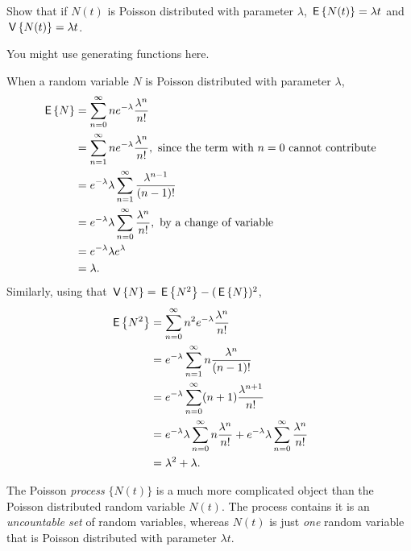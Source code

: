 \begin{question}
  Show that if $N(t)$ is Poisson distributed with parameter $\lambda$, $\,\mathsf{E}\left\{N(t)\right\} = \lambda t$ and $\,\mathsf{V}\left\{N(t)\right\} = \lambda t$. 


  \begin{hint}
  You might use generating functions here.
  \end{hint}

  \begin{solution} 
    When a random variable $N$ is Poisson distributed with parameter
    $\lambda$,
    \begin{equation*}
      \begin{split}
      \,\mathsf{E}\left\{N\right\} 
&= \sum_{n=0}^\infty n e^{-\lambda}\frac{\lambda^n}{n!}  \\
&= \sum_{n=1}^\infty n e^{-\lambda}\frac{\lambda^n}{n!}, \text{ since the term with $n=0$ cannot contribute} \\
&= e^{-\lambda} \lambda \sum_{n=1}^\infty \frac{\lambda^{n-1}}{(n-1)!} \\
&= e^{-\lambda} \lambda \sum_{n=0}^\infty \frac{\lambda^{n}}{n!}, \text{ by a change of variable}\\
&= e^{-\lambda} \lambda e^{\lambda} \\
&= \lambda.
      \end{split}
    \end{equation*}
Similarly, using that $\,\mathsf{V}\left\{N\right\} = \,\mathsf{E}\left\{N^2\right\} - (\,\mathsf{E}\left\{N\right\})^2$, 
    \begin{equation*}
      \begin{split}
      \,\mathsf{E}\left\{N^2\right\}
&= \sum_{n=0}^\infty n^2 e^{-\lambda}\frac{\lambda^n}{n!}  \\
&= e^{-\lambda} \sum_{n=1}^\infty n \frac{\lambda^n}{(n-1)!}  \\
&= e^{-\lambda} \sum_{n=0}^\infty (n+1) \frac{\lambda^{n+1}}{n!}  \\
&= e^{-\lambda} \lambda \sum_{n=0}^\infty n \frac{\lambda^{n}}{n!}  +e^{-\lambda}\lambda \sum_{n=0}^\infty\frac{\lambda^{n}}{n!}  \\
&= \lambda^2  + \lambda.
\end{split}
\end{equation*}

The Poisson \emph{process} $\{N(t)\}$ is a much more complicated
object than the Poisson distributed random variable $N(t)$. The
process contains it is an \emph{ uncountable set} of random variables,
whereas $N(t)$ is just \emph{one} random variable that is Poisson
distributed with parameter $\lambda t$. 
\end{solution}
\end{question}


